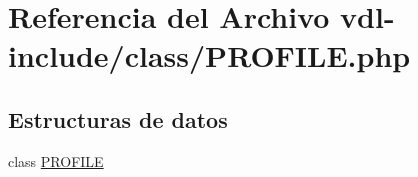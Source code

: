 \hypertarget{PROFILE_8php}{\section{Referencia del Archivo vdl-\/include/class/\-P\-R\-O\-F\-I\-L\-E.php}
\label{PROFILE_8php}
}
\subsection*{Estructuras de datos}
\begin{DoxyCompactItemize}
\item 
class \hyperlink{classPROFILE}{P\-R\-O\-F\-I\-L\-E}
\end{DoxyCompactItemize}
